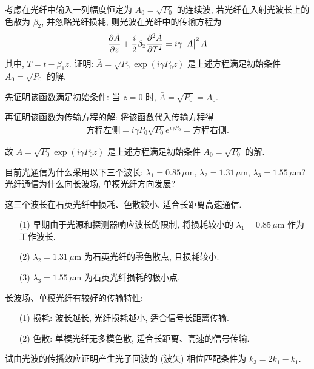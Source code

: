 \documentclass{assignment}
\begin{document}
\begin{prob}
    考虑在光纤中输入一列幅度恒定为 $A_0=\sqrt{P_0}$ 的连续波, 若光纤在入射光波长上的色散为 $\beta_2$, 并忽略光纤损耗, 则光波在光纤中的传输方程为
    \[
        \frac{\partial\bar{A}}{\partial z}+\frac{i}{2}\beta_2\frac{\partial^2\bar{A}}{\partial T^2}=i\gamma\left\lvert\bar{A}\right\rvert^2\bar{A}
    \]
    其中, $T=t-\beta_1z$. 证明: $\bar{A}=\sqrt{P_0}\exp(i\gamma P_0z)$ 是上述方程满足初始条件 $\bar{A}_0=\sqrt{P_0}$ 的解.
\end{prob}
\begin{pf}
    先证明该函数满足初始条件: 当 $z=0$ 时, $\bar{A}=\sqrt{P_0}=A_0$.

    再证明该函数为传输方程的解: 将该函数代入传输方程得
    \begin{align}
        \text{方程左侧}=i\gamma P_0\sqrt{P_0}e^{i\gamma P_0}=\text{方程右侧}.
    \end{align}

    故 $\bar{A}=\sqrt{P_0}\exp(i\gamma P_0z)$ 是上述方程满足初始条件 $\bar{A}_0=\sqrt{P_0}$ 的解.
\end{pf}

\begin{prob}
    目前光通信为什么采用以下三个波长: $\lambda_1=0.85\,\mu$m, $\lambda_2=1.31\,\mu$m, $\lambda_3=1.55\,\mu$m? 光纤通信为什么向长波场, 单模光纤方向发展?
\end{prob}
\begin{sol}
    这三个波长在石英光纤中损耗、色散较小, 适合长距离高速通信.

    \begin{itemize}
        \item[(1)] 早期由于光源和探测器响应波长的限制, 将损耗较小的 $\lambda_1=0.85\,\mu$m 作为工作波长.
        \item[(2)] $\lambda_2=1.31\,\mu$m 为石英光纤的零色散点, 且损耗较小.
        \item[(3)] $\lambda_3=1.55\,\mu$m 为石英光纤损耗的极小点.
    \end{itemize}

    长波场、单模光纤有较好的传输特性:
    \begin{itemize}
        \item[(1)] 损耗: 波长越长, 光纤损耗越小, 适合信号长距离传输.
        \item[(2)] 色散: 单模光纤无多模色散, 适合长距离、高速的信号传输.
    \end{itemize}
\end{sol}

\begin{prob}
    试由光波的传播效应证明产生光子回波的 (波矢) 相位匹配条件为 $k_3=2k_1-k_1$.
\end{prob}
\begin{pf}

\end{pf}
\end{document}
